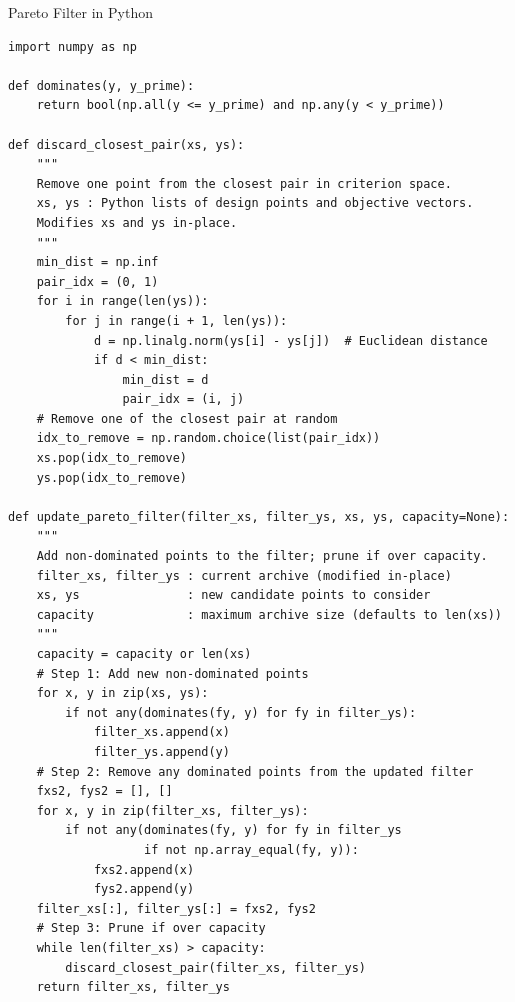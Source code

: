 \documentclass[aspectratio=169,10pt]{beamer}
\begin{document}
\begin{frame}[fragile]{Pareto Filter in Python}

\begin{lstlisting}
import numpy as np

def dominates(y, y_prime):
    return bool(np.all(y <= y_prime) and np.any(y < y_prime))

def discard_closest_pair(xs, ys):
    """
    Remove one point from the closest pair in criterion space.
    xs, ys : Python lists of design points and objective vectors.
    Modifies xs and ys in-place.
    """
    min_dist = np.inf
    pair_idx = (0, 1)
    for i in range(len(ys)):
        for j in range(i + 1, len(ys)):
            d = np.linalg.norm(ys[i] - ys[j])  # Euclidean distance
            if d < min_dist:
                min_dist = d
                pair_idx = (i, j)
    # Remove one of the closest pair at random
    idx_to_remove = np.random.choice(list(pair_idx))
    xs.pop(idx_to_remove)
    ys.pop(idx_to_remove)

def update_pareto_filter(filter_xs, filter_ys, xs, ys, capacity=None):
    """
    Add non-dominated points to the filter; prune if over capacity.
    filter_xs, filter_ys : current archive (modified in-place)
    xs, ys               : new candidate points to consider
    capacity             : maximum archive size (defaults to len(xs))
    """
    capacity = capacity or len(xs)
    # Step 1: Add new non-dominated points
    for x, y in zip(xs, ys):
        if not any(dominates(fy, y) for fy in filter_ys):
            filter_xs.append(x)
            filter_ys.append(y)
    # Step 2: Remove any dominated points from the updated filter
    fxs2, fys2 = [], []
    for x, y in zip(filter_xs, filter_ys):
        if not any(dominates(fy, y) for fy in filter_ys
                   if not np.array_equal(fy, y)):
            fxs2.append(x)
            fys2.append(y)
    filter_xs[:], filter_ys[:] = fxs2, fys2
    # Step 3: Prune if over capacity
    while len(filter_xs) > capacity:
        discard_closest_pair(filter_xs, filter_ys)
    return filter_xs, filter_ys
\end{lstlisting}

\end{frame}
\end{document}
